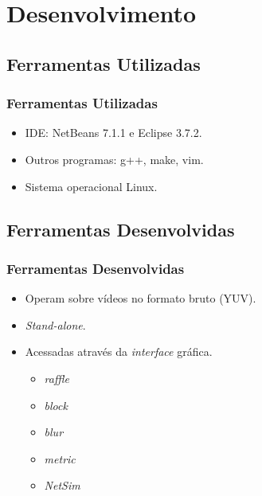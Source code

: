 \section{Desenvolvimento}

\subsection{Ferramentas Utilizadas}
    \begin{frame}\frametitle{Ferramentas Utilizadas}
        \begin{itemize}
            \item IDE: NetBeans 7.1.1 e Eclipse 3.7.2.
            \item Outros programas: g++, make, vim.
            \item Sistema operacional Linux.
        \end{itemize}
    \end{frame}
    
\subsection{Ferramentas Desenvolvidas}
    \begin{frame}\frametitle{Ferramentas Desenvolvidas}
        \begin{itemize}
            \item Operam sobre vídeos no formato bruto (YUV). %
            \item \emph{Stand-alone}.
            \item Acessadas através da \emph{interface} gráfica.
            \begin{itemize}
                \item \emph{raffle}
                \item \emph{block}
                \item \emph{blur}
                \item \emph{metric}
                \item \emph{NetSim}
            \end{itemize}
        \end{itemize}
    \end{frame}
    
